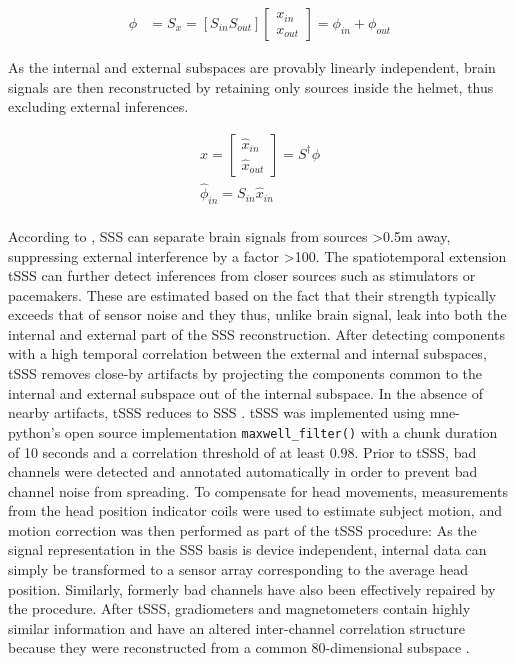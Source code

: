 \begin{equation}
	\begin{aligned}
			\phi &= S_x = [S_{in} S_{out}] \begin{bmatrix}
			x_{in} \\
			x_{out}
		\end{bmatrix} = \phi_{in} + \phi_{out}
	\end{aligned}
	\label{eq:sss}
\end{equation}

As the internal and external subspaces are provably linearly independent, brain signals are then reconstructed by retaining only sources inside the helmet, thus excluding external inferences.


\begin{equation}
	\begin{aligned}
    \hat{x} =
\begin{bmatrix}
	\hat{x}_{in} \\
	\hat{x}_{out}
\end{bmatrix}
= S^{\dagger}\phi \\
\hat{\phi}_{in} = S_{in}\hat{x}_{in}\\
	\end{aligned}
	\label{eq:sss}
\end{equation}


According to \citet{taulu2006spatiotemporal}, \gls{SSS} can separate brain signals from sources >0.5m away, suppressing external interference by a factor >100.
The spatiotemporal extension \gls{tSSS} can further detect inferences from closer sources such as stimulators or pacemakers.
These are estimated based on the fact that their strength typically exceeds that of sensor noise and they thus, unlike brain signal, leak into both the internal and external part of the \gls{SSS} reconstruction.
After detecting components with a high temporal correlation between the external and internal subspaces, \gls{tSSS} removes close-by artifacts by projecting the components common to the internal and external subspace out of the internal subspace.
In the absence of nearby artifacts, \gls{tSSS} reduces to \gls{SSS} \citep{taulu2009removal}.
\gls{tSSS} was implemented using mne-python's open source implementation \texttt{maxwell\_filter()} with a chunk duration of 10 seconds and a correlation threshold of at least $0.98$.
Prior to \gls{tSSS}, bad channels were detected and annotated automatically in order to prevent bad channel noise from spreading.
To compensate for head movements, measurements from the head position indicator coils were used to estimate subject motion, and motion correction was then performed as part of the \gls{tSSS} procedure: As the signal representation in the \gls{SSS} basis is device independent, internal data can simply be transformed to a sensor array corresponding to the average head position.
Similarly, formerly bad channels have also been effectively repaired by the procedure.
After \gls{tSSS}, gradiometers and magnetometers contain highly similar information and have an altered inter-channel correlation structure because they were reconstructed from a common 80-dimensional subspace \citep{garces2017choice}.


